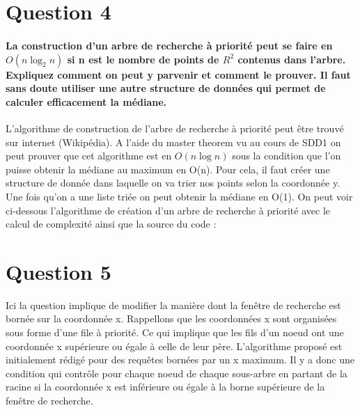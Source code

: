 \documentclass{article}
\begin{document}
\section{Question 4}
    \paragraph{La construction d’un arbre de recherche à priorité peut se faire en $O(n \log_2 n)$ si n est le
        nombre de points de $R^2$ contenus dans l’arbre. Expliquez comment on peut y parvenir et
    comment le prouver. Il faut sans doute utiliser une autre structure de données qui permet
    de calculer efficacement la médiane.}
    L'algorithme de construction de l'arbre de recherche à priorité peut être trouvé sur internet (Wikipédia). A l'aide du master theorem
    vu au cours de SDD1 on peut prouver que cet algorithme est en $O(n \log n)$ sous la condition que l'on puisse obtenir la médiane au 
    maximum en O(n). Pour cela, il faut créer une structure de donnée dans laquelle on va trier nos points selon la coordonnée y. Une fois qu'on 
    a une liste triée on peut obtenir la médiane en O(1). On peut voir ci-dessous l'algorithme de création d'un arbre de recherche à priorité
    avec le calcul de complexité ainsi que la source du code : 

\section{Question 5}
Ici la question implique de modifier la manière dont la fenêtre de recherche est bornée sur la coordonnée x. Rappellons que les coordonnées x sont organisées sous forme d'une file à priorité.
Ce qui implique que les fils d'un noeud ont une coordonnée x supérieure ou égale à celle de leur père. L'algorithme proposé est initialement rédigé pour des requêtes bornées par un x maximum. Il y a donc
une condition qui contrôle pour chaque noeud de chaque sous-arbre en partant de la racine si la coordonnée x est inférieure ou égale à la borne supérieure de la fenêtre de recherche. \\
\end{document}
